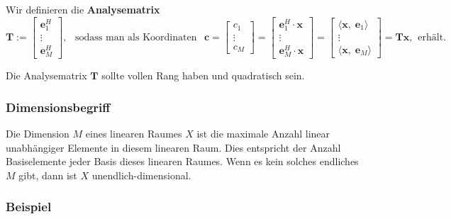 \documentclass[11pt]{article}
\begin{document}
Wir definieren die \textbf{Analysematrix}
$$\mathbf{T}:= \begin{bmatrix}
    \mathbf{e}_1^H \\
    \vdots \\
    \mathbf{e}_M^H
\end{bmatrix},\hspace{5pt} \text{ sodass man als Koordinaten }\hspace{5pt}  \mathbf{c} = \begin{bmatrix}
    c_1 \\
    \vdots \\
    c_M
\end{bmatrix} = \begin{bmatrix}
    \mathbf{e}_1^H \cdot \mathbf{x}\\
    \vdots \\
    \mathbf{e}_M^H \cdot \mathbf{x}
\end{bmatrix} = \begin{bmatrix}
    \langle \mathbf{x}, \; \mathbf{e}_1 \rangle \\
    \vdots \\
    \langle \mathbf{x}, \; \mathbf{e}_M \rangle 
\end{bmatrix} = \mathbf{Tx}, \hspace{5pt} \text{erhält.}$$

Die Analysematrix $\mathbf{T}$ sollte vollen Rang haben und quadratisch sein.

\vspace*{-0.5cm}
\subsubsection*{Dimensionsbegriff}
\vspace*{-0.5cm}
Die Dimension $M$ eines linearen Raumes $X$ ist die maximale Anzahl linear unabhängiger Elemente in diesem linearen Raum. Dies entspricht der Anzahl Basiselemente jeder Basis dieses linearen Raumes. Wenn es kein solches endliches $M$ gibt, dann ist $X$ unendlich-dimensional.

\vspace*{-0.5cm}
\subsubsection*{Beispiel}
\vspace*{-0.5cm}
\end{document}
